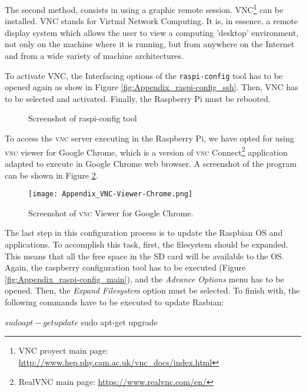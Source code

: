 The second method, consists in using a graphic remote session. VNC\footnote{VNC proyect main page: \url{http://www.hep.phy.cam.ac.uk/vnc_docs/index.html}} can be installed. VNC stands for Virtual Network Computing. It is, in essence, a remote display system which allows the user to view a computing 'desktop' environment, not only on the machine where it is running, but from anywhere on the Internet and from a wide variety of machine architectures. 

To activate VNC, the Interfacing options of the \texttt{raspi-config} tool has to be opened again as show in Figure \ref{fig:Appendix_raspi-config_ssh}. Then, VNC has to be selected and activated. Finally, the Raspberry Pi must be rebooted.

\begin{figure}[!h]
	\centering
	\caption{Screenshot of raspi-config tool}
	\label{fig:Appendix_raspi-config}
\end{figure}

To access the \textsc{vnc} server executing in the Raspberry Pi, we have opted for using \textsc{vnc} viewer for Google Chrome, which is a version of \textsc{vnc} Connect\footnote{RealVNC main page: \url{https://www.realvnc.com/en/}} application adapted to execute in Google Chrome web browser. A screenshot of the program can be shown in Figure \ref{fig:Appendix_VNC-Viewer-Chrome}.

\begin{figure}[!h]
	\begin{center}
		\texttt{[image: Appendix\_VNC-Viewer-Chrome.png]}
		\caption{Screenshot of \textsc{vnc} Viewer for Google Chrome.}
		\label{fig:Appendix_VNC-Viewer-Chrome}
	\end{center}
\end{figure}

The last step in this configuration process is to update the Raspbian \ac{OS} and applications. To accomplish this task, first, the filesystem should be expanded. This means that all the free space in the SD card will be available to the \ac{OS}. Again, the raspberry configuration tool has to be executed (Figure \ref{fig:Appendix_raspi-config_main}), and the \emph{Advance Options} menu has to be opened. Then, the \emph{Expand Filesystem} option must be selected. To finish with, the following commands have to be executed to update Rasbian:
\begin{console}
$ sudo apt-get update
$ sudo apt-get upgrade
\end{console} %


